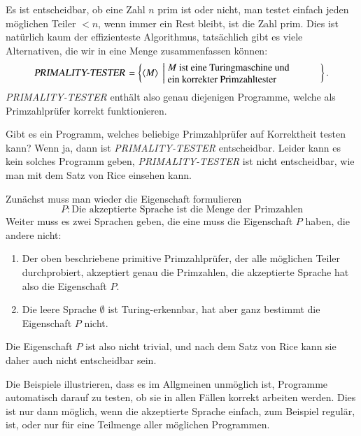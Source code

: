 \begin{beispiel}[\bf Primzahlprüfer] Es ist entscheidbar, ob eine Zahl $n$
prim ist oder nicht, man testet einfach jeden möglichen Teiler $<n$,
wenn immer ein Rest bleibt, ist die Zahl prim.
Dies ist natürlich
kaum der effizienteste Algorithmus, tatsächlich gibt es viele Alternativen,
die wir in eine Menge zusammenfassen können:
\[
\text{\textsl{PRIMALITY-TESTER}}=
\left\{\langle M\rangle\;\left|\;
\begin{minipage}{2.15truein}
\raggedright
$M$ ist eine Turingmaschine und\\
ein korrekter Primzahltester
\end{minipage}
\right.\right\}.
\]
%
\textsl{PRIMALITY-TESTER} enthält also genau diejenigen Programme, welche
als Primzahlprüfer korrekt funktionieren.

Gibt es ein Programm, welches beliebige Primzahlprüfer auf Korrektheit
testen kann? Wenn ja, dann ist \textsl{PRIMALITY-TESTER} entscheidbar.
Leider kann es kein solches Programm geben,
\textsl{PRIMALITY-TESTER} ist nicht entscheidbar, wie man mit dem Satz
von Rice einsehen kann.

Zunächst muss man wieder die Eigenschaft formulieren
\[
P: \text{Die akzeptierte Sprache ist die Menge der Primzahlen}
\]
Weiter muss es zwei Sprachen geben, die eine muss die Eigenschaft
$P$ haben, die andere nicht:
\begin{enumerate}
\item
Der oben beschriebene primitive Primzahlprüfer, der alle möglichen Teiler
durchprobiert, akzeptiert genau die Primzahlen, die akzeptierte Sprache
hat also die Eigenschaft $P$.
\item 
Die leere Sprache $\emptyset$ ist Turing-erkennbar, hat aber ganz bestimmt
die Eigenschaft $P$ nicht.
\end{enumerate}
Die Eigenschaft $P$ ist also nicht trivial, und nach dem Satz von Rice
kann sie daher auch nicht entscheidbar sein.
\end{beispiel}

Die Beispiele illustrieren, dass es im Allgmeinen unmöglich ist, Programme
automatisch darauf zu testen, ob sie in allen Fällen korrekt arbeiten
werden.
Dies ist nur dann möglich, wenn die akzeptierte Sprache einfach,
zum Beispiel regulär, ist, oder nur für eine Teilmenge aller möglichen
Programmen.
